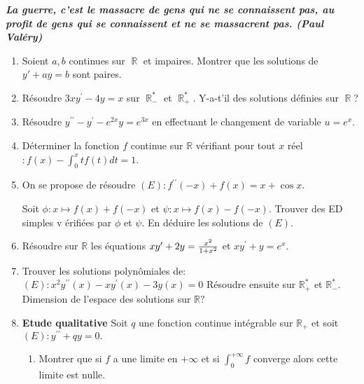\documentclass[12pt,a4paper]{article}
\DeclareMathOperator{\R}{\mathbb{R}}
\begin{document}
\emph{\textbf{
La guerre, c'est le massacre de gens qui ne se connaissent pas, au profit de gens qui se connaissent et ne se massacrent pas. (Paul Valéry)
}}


\begin{enumerate}
%

\item Soient $a,b$ continues sur $\R$ et impaires. Montrer que les solutions de $y'+ay=b$ sont paires.

\item
 R\'{e}soudre $3xy^{\prime }-4y=x$ sur $\R_-^*$ et $\R_+^*$. Y-a-t'il des solutions définies sur $\R$?
\item R\'{e}soudre $y^{\prime \prime }-y^{\prime }-e^{2x}y=e^{3x}$ en
effectuant le changement de variable $u=e^{x}.$

\item D\'{e}terminer la fonction $f$ continue sur $\mathbb{R}$ vérifiant pour tout $x$ réel $:f\left( x\right) -\int_{0}^{x}tf\left( t\right) dt=1$.
\item On se propose de r\'{e}soudre $\left( E\right) :f^{\prime \prime
}\left( -x\right) +f\left( x\right) =x+\cos x.$

Soit $\phi :x\mapsto f\left( x\right) +f\left( -x\right) $ et $\psi
:x\mapsto f\left( x\right) -f\left( -x\right) .$ Trouver des ED simples v%
\'{e}rifi\'{e}es par $\phi $ et $\psi .$ En d\'{e}duire les solutions de $%
\left( E\right) .$
\item R\'{e}soudre sur $\mathbb{R}$ les \'{e}quations $xy^{\prime }+2y=\frac{%
	x^{2}}{1+x^{2}}$ et $xy^{\prime }+y=e^{x}.$
\item Trouver les solutions polyn\^{o}miales de:%
$
	\left( E\right) :x^{2}y^{\prime \prime }\left( x\right) -xy^{\prime }\left(
	x\right) -3y\left( x\right) =0
$
R\'{e}soudre ensuite sur $\mathbb{R}_{+}^{\ast }$ et $\mathbb{R}_{-}^{\ast }.$
Dimension de l'espace des solutions sur $\mathbb{R}?$

\item \textbf{Etude qualitative}
Soit $q$ une fonction continue int\'{e}grable sur $\mathbb{R}_{+}$ et
soit $\left( E\right) :y^{\prime \prime }+qy=0.$

\begin{enumerate}
	\item Montrer que si $f$ a une limite en $+\infty $ et si $\int_{0}^{+\infty
	}f$ converge alors cette limite est nulle.
	

\end{enumerate}
\end{enumerate}
\end{document}
